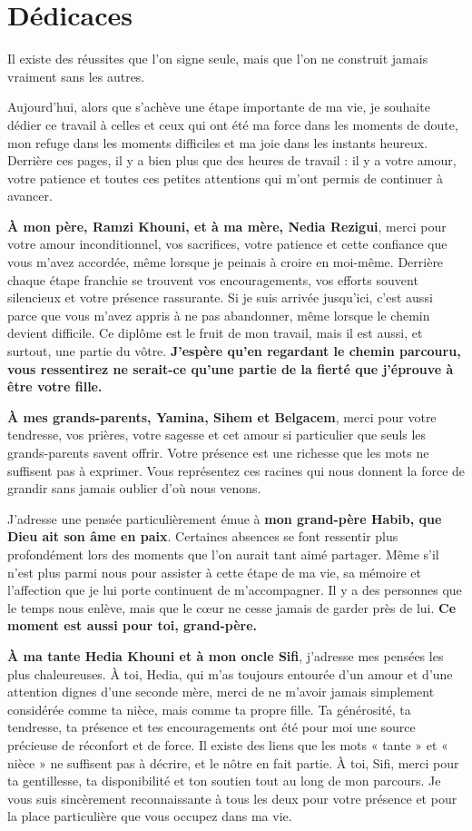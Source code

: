 \section*{Dédicaces}

Il existe des réussites que l’on signe seule, mais que l’on ne construit jamais vraiment sans les autres.

Aujourd’hui, alors que s’achève une étape importante de ma vie, je souhaite dédier ce travail à celles et ceux qui ont été ma force dans les moments de doute, mon refuge dans les moments difficiles et ma joie dans les instants heureux. Derrière ces pages, il y a bien plus que des heures de travail : il y a votre amour, votre patience et toutes ces petites attentions qui m’ont permis de continuer à avancer.

\textbf{À mon père, Ramzi Khouni, et à ma mère, Nedia Rezigui}, merci pour votre amour inconditionnel, vos sacrifices, votre patience et cette confiance que vous m’avez accordée, même lorsque je peinais à croire en moi-même. Derrière chaque étape franchie se trouvent vos encouragements, vos efforts souvent silencieux et votre présence rassurante. Si je suis arrivée jusqu’ici, c’est aussi parce que vous m’avez appris à ne pas abandonner, même lorsque le chemin devient difficile. Ce diplôme est le fruit de mon travail, mais il est aussi, et surtout, une partie du vôtre. \textbf{J’espère qu’en regardant le chemin parcouru, vous ressentirez ne serait-ce qu’une partie de la fierté que j’éprouve à être votre fille.}

\textbf{À mes grands-parents, Yamina, Sihem et Belgacem}, merci pour votre tendresse, vos prières, votre sagesse et cet amour si particulier que seuls les grands-parents savent offrir. Votre présence est une richesse que les mots ne suffisent pas à exprimer. Vous représentez ces racines qui nous donnent la force de grandir sans jamais oublier d’où nous venons.

J’adresse une pensée particulièrement émue à \textbf{mon grand-père Habib, que Dieu ait son âme en paix}. Certaines absences se font ressentir plus profondément lors des moments que l’on aurait tant aimé partager. Même s’il n’est plus parmi nous pour assister à cette étape de ma vie, sa mémoire et l’affection que je lui porte continuent de m’accompagner. Il y a des personnes que le temps nous enlève, mais que le cœur ne cesse jamais de garder près de lui. \textbf{Ce moment est aussi pour toi, grand-père.}

\textbf{À ma tante Hedia Khouni et à mon oncle Sifi}, j’adresse mes pensées les plus chaleureuses. À toi, Hedia, qui m’as toujours entourée d’un amour et d’une attention dignes d’une seconde mère, merci de ne m’avoir jamais simplement considérée comme ta nièce, mais comme ta propre fille. Ta générosité, ta tendresse, ta présence et tes encouragements ont été pour moi une source précieuse de réconfort et de force. Il existe des liens que les mots « tante » et « nièce » ne suffisent pas à décrire, et le nôtre en fait partie. À toi, Sifi, merci pour ta gentillesse, ta disponibilité et ton soutien tout au long de mon parcours. Je vous suis sincèrement reconnaissante à tous les deux pour votre présence et pour la place particulière que vous occupez dans ma vie.

